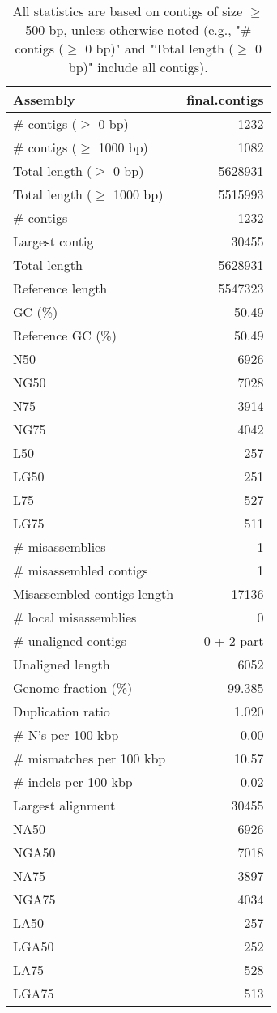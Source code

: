 \documentclass[12pt,a4paper]{article}
\begin{document}
\begin{table}[ht]
\begin{center}
\caption{All statistics are based on contigs of size $\geq$ 500 bp, unless otherwise noted (e.g., "\# contigs ($\geq$ 0 bp)" and "Total length ($\geq$ 0 bp)" include all contigs).}
\begin{tabular}{|l*{1}{|r}|}
\hline
Assembly & final.contigs \\ \hline
\# contigs ($\geq$ 0 bp) & 1232 \\ \hline
\# contigs ($\geq$ 1000 bp) & 1082 \\ \hline
Total length ($\geq$ 0 bp) & 5628931 \\ \hline
Total length ($\geq$ 1000 bp) & 5515993 \\ \hline
\# contigs & 1232 \\ \hline
Largest contig & 30455 \\ \hline
Total length & 5628931 \\ \hline
Reference length & 5547323 \\ \hline
GC (\%) & 50.49 \\ \hline
Reference GC (\%) & 50.49 \\ \hline
N50 & 6926 \\ \hline
NG50 & 7028 \\ \hline
N75 & 3914 \\ \hline
NG75 & 4042 \\ \hline
L50 & 257 \\ \hline
LG50 & 251 \\ \hline
L75 & 527 \\ \hline
LG75 & 511 \\ \hline
\# misassemblies & 1 \\ \hline
\# misassembled contigs & 1 \\ \hline
Misassembled contigs length & 17136 \\ \hline
\# local misassemblies & 0 \\ \hline
\# unaligned contigs & 0 + 2 part \\ \hline
Unaligned length & 6052 \\ \hline
Genome fraction (\%) & 99.385 \\ \hline
Duplication ratio & 1.020 \\ \hline
\# N's per 100 kbp & 0.00 \\ \hline
\# mismatches per 100 kbp & 10.57 \\ \hline
\# indels per 100 kbp & 0.02 \\ \hline
Largest alignment & 30455 \\ \hline
NA50 & 6926 \\ \hline
NGA50 & 7018 \\ \hline
NA75 & 3897 \\ \hline
NGA75 & 4034 \\ \hline
LA50 & 257 \\ \hline
LGA50 & 252 \\ \hline
LA75 & 528 \\ \hline
LGA75 & 513 \\ \hline
\end{tabular}
\end{center}
\end{table}
\end{document}
